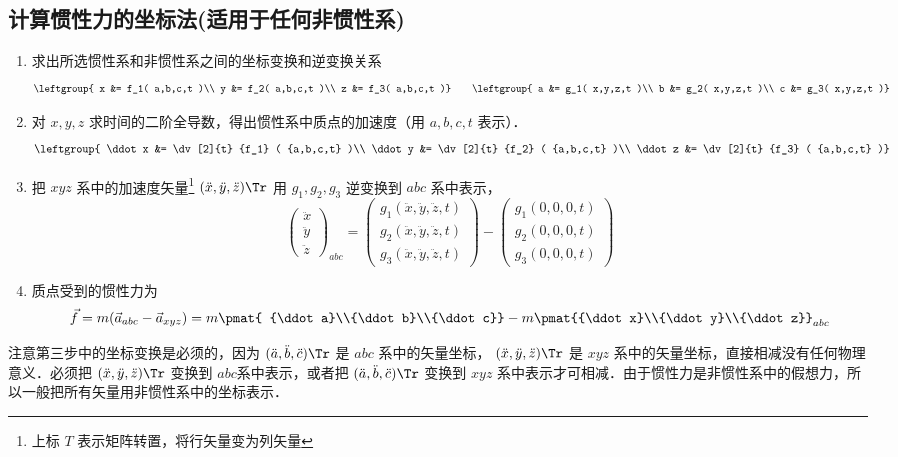 \subsection{计算惯性力的坐标法(适用于任何非惯性系)}
\begin{enumerate}
\item 求出所选惯性系和非惯性系之间的坐标变换和逆变换关系
\begin{equation}
\leftgroup{
x &= f_1( a,b,c,t )\\
y &= f_2( a,b,c,t )\\
z &= f_3( a,b,c,t )}
\qquad
\leftgroup{
a &= g_1( x,y,z,t )\\
b &= g_2( x,y,z,t )\\
c &= g_3( x,y,z,t )}
\end{equation}
\item 对 $x,y,z$ 求时间的二阶全导数，得出惯性系中质点的加速度（用 $a,b,c,t$ 表示）．
\begin{equation}
\leftgroup{
\ddot x &= \dv[2]{t} {f_1} ( {a,b,c,t} )\\
\ddot y &= \dv[2]{t} {f_2} ( {a,b,c,t} )\\
\ddot z &= \dv[2]{t} {f_3} ( {a,b,c,t} )}
\end{equation}

\item 把 $xyz$ 系中的加速度矢量\footnote{上标 $T$ 表示矩阵转置，将行矢量变为列矢量} $({\ddot x},{\ddot y},{\ddot z})\Tr$ 用 $g_1,g_2,g_3$ 逆变换到 $abc$ 系中表示，
\begin{equation}
\begin{pmatrix} {\ddot x}\\{\ddot y}\\{\ddot z}\end{pmatrix}_{abc} = \begin{pmatrix} g_1(\ddot x,\ddot y,\ddot z, t)\\g_2(\ddot x,\ddot y,\ddot z, t)\\g_3(\ddot x,\ddot y,\ddot z, t)\end{pmatrix} -
\begin{pmatrix} g_1(0,0,0,t)\\g_2(0,0,0,t)\\g_3(0,0,0,t) \end{pmatrix}
\end{equation}

\item 质点受到的惯性力为
\begin{equation}\label{Iner_eq9}
\vec f = m ( {{{\vec a}_{abc}} - {{\vec a}_{xyz}}} ) = 
m\pmat{ {\ddot a}\\{\ddot b}\\{\ddot c}} - m\pmat{{\ddot x}\\{\ddot y}\\{\ddot z}}_{abc}
\end{equation}
\end{enumerate}
注意第三步中的坐标变换是必须的，因为 $({\ddot a},{\ddot b},{\ddot c})\Tr$ 是 $abc$ 系中的矢量坐标， $({\ddot x},{\ddot y},{\ddot z})\Tr$ 是 $xyz$ 系中的矢量坐标，直接相减没有任何物理意义．必须把 $({\ddot x},{\ddot y},{\ddot z})\Tr$ 变换到 $abc$系中表示，或者把 $({\ddot a},{\ddot b},{\ddot c})\Tr$ 变换到 $xyz$ 系中表示才可相减．由于惯性力是非惯性系中的假想力，所以一般把所有矢量用非惯性系中的坐标表示．

